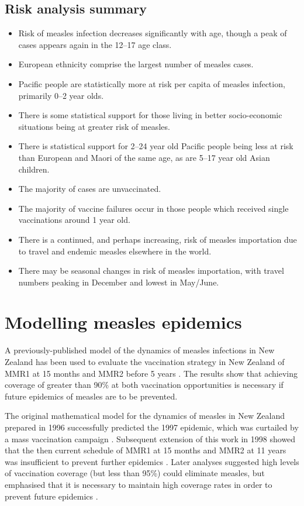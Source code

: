 \documentclass{article}
\begin{document}
\subsection{Risk analysis summary}
\begin{itemize}
\item Risk of measles infection decreases significantly with age, though a peak of cases appears again in the 12--17 age class.
\item European ethnicity comprise the largest number of measles cases.
\item Pacific people are statistically more at risk per capita of measles infection, primarily 0--2 year olds.
\item There is some statistical support for those living in better socio-economic situations being at greater risk of measles.
\item There is statistical support for 2--24 year old Pacific people being less at risk than European and Maori of the same age, as are 5--17 year old Asian children.
\item The majority of cases are unvaccinated.
\item The majority of vaccine failures occur in those people which received single vaccinations around 1 year old.
\item There is a continued, and perhaps increasing, risk of measles importation due to travel and endemic measles elsewhere in the world.
\item There may be seasonal changes in risk of measles importation, with travel numbers peaking in December and lowest in May/June.
\end{itemize}

\section{Modelling measles epidemics}
\label{section:epidemic_modelling}

A previously-published model of the dynamics of measles infections in New Zealand has been used to evaluate the vaccination strategy in New Zealand of MMR1 at 15 months and MMR2 before 5 years \citep{roberts0,roberts4,tobias98}. The results show that achieving coverage of greater than 90\% at both vaccination opportunities is necessary if future epidemics of measles are to be prevented.

The original mathematical model for the dynamics of measles in New Zealand prepared in 1996 \citep{tobias98} successfully predicted the 1997 epidemic, which was curtailed by a mass vaccination campaign \citep{mansoor98,roberts0}. Subsequent extension of this work in 1998 showed that the then current schedule of MMR1 at 15 months and MMR2 at 11 years was insufficient to prevent further epidemics \citep{roberts0}. Later analyses suggested high levels of vaccination coverage (but less than 95\%) could eliminate measles, but emphasised that it is necessary to maintain high coverage rates in order to prevent future epidemics \citep{roberts4}.
\end{document}
